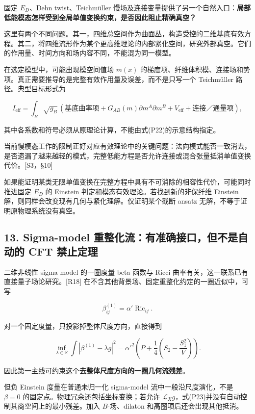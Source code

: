 \documentclass[UTF8,a4paper,11pt,fontset=fandol]{ctexart}
\begin{document}
固定 \(E_D\)、Dehn twist、Teichmüller
慢场及连接变量提供了另一个自然入口：\textbf{局部低能模态怎样受到全局单值变换约束，是否因此阻止精确真空？}

这里有两个不同问题。其一，四维总空间作为曲面丛，构造受控的二维基底有效方程。其二，将四维流形作为某个更高维理论的内部紧化空间，研究外部真空。它们的作用量、时间方向和场内容不同，不能混为同一模型。

在选定模型中，可能出现模空间值场 \(m(x)\)
的梯度项、纤维体积模、连接场和势项。真正需要推导的是完整有效作用量及误差，而不是只写一个
Teichmüller 路径。典型目标形式为

\[
I_{\mathrm{eff}}=
\int_B\sqrt{g_B}\,
\left(\text{基底曲率项}
+G_{AB}(m)\partial m^A\partial m^B
+V_{\mathrm{eff}}+\text{连接／通量项}\right),
\tag{P22}
\]

其中各系数和符号必须从原理论计算，不能由式(P22)的示意结构指定。

当前慢模态工作的限制正好对应有效理论中的关键问题：法向模式能否一致消去，是否遗漏了越来越轻的模式，完整低能方程是否允许连接或混合张量抵消单值变换代价。{[}S3，§10{]}

如果能证明某类无限单值变换在完整方程中具有不可消除的相容性代价，可能同时推进固定
\(E_D\) 的 Einstein 判定和模态有效理论。若找到新的非保纤维 Einstein
解，则同样会改变现有几何与紧化理解。仅证明某个截断 ansatz
无解，不等于证明原物理系统没有真空。

\subsection{13. Sigma-model 重整化流：有准确接口，但不是自动的 CFT
禁止定理}\label{sigma-model-ux91cdux6574ux5316ux6d41ux6709ux51c6ux786eux63a5ux53e3ux4f46ux4e0dux662fux81eaux52a8ux7684-cft-ux7981ux6b62ux5b9aux7406}

二维非线性 sigma model 的一圈度量 beta 函数与 Ricci
曲率有关，这一联系已有直接量子场论研究。{[}R18{]}
在不含其他背景场、固定重整化约定的一圈近似中，可写

\[
\beta^{(1)}_{ij}=\alpha'\operatorname{Ric}_{ij}.
\]

对一个固定度量，只投影掉整体尺度方向，直接得到

\[
\boxed{
\inf_{\lambda\in\mathbb R}\int|\beta^{(1)}-\lambda g|^2
=\alpha'^2\left(P+\frac14\left(S_2-\frac{S_1^2}{V}\right)\right).
}
\tag{P23}
\]

因此第一主线可约束这个\textbf{去整体尺度方向的一圈几何流残差}。

但负 Einstein 度量在普通未归一化 sigma-model 流中一般沿尺度演化，不是
\(\beta=0\) 的固定点。物理冗余还包括坐标变换；若允许
\(\mathcal L_Xg\)，式(P23)并没有自动控制其商空间上的最小残差。加入
\(B\)-场、dilaton 和高圈项后还会出现其他抵消。
\end{document}
